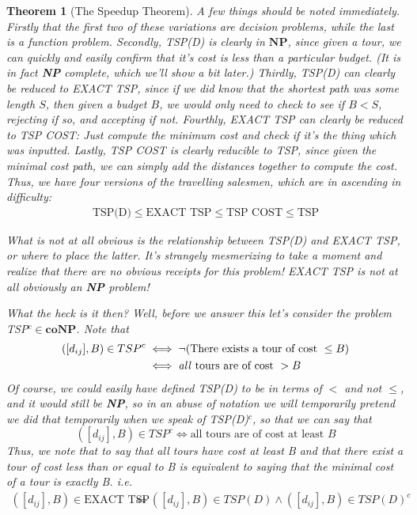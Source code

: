 \documentclass{article}
\theoremstyle{definition}
\theoremstyle{plain}
\theoremstyle{theorem}
\newtheorem{theorem}{Theorem}[section]
\begin{document}
\begin{theorem}[The Speedup Theorem]
A few things should be noted immediately. Firstly that the first two of these variations are decision problems, while the last is a function problem. Secondly, TSP(D) is clearly in $\textbf{NP}$, since given a tour, we can quickly and easily confirm that it's cost is less than a particular budget. (It is in fact \textbf{NP} complete, which we'll show a bit later.) Thirdly, TSP(D) can clearly be reduced to EXACT TSP, since if we \textit{did} know that the shortest path was some length $S$, then given a budget $B$, we would only need to check to see if $B < S$, rejecting if so, and accepting if not. Fourthly, EXACT TSP can clearly be reduced to TSP COST: Just compute the minimum cost and check if it's the thing which was inputted. Lastly, TSP COST is clearly reducible to TSP, since given the minimal cost path, we can simply add the distances together to compute the cost.
Thus, we have four versions of the travelling salesmen, which are in ascending in difficulty:
\begin{align}
    \textrm{TSP(D)} \leq \textrm{EXACT TSP} \leq \textrm{TSP COST} \leq \textrm{TSP}
\end{align}
\par What is \textit{not} at all obvious is the relationship between TSP(D) and EXACT TSP, or where to place the latter. It's strangely mesmerizing to take a moment and realize that there are no obvious receipts for this problem! EXACT TSP is not at all obviously an \textbf{NP} problem!
\par What the heck is it then? Well, before we answer this let's consider the problem TSP$^c \in \textbf{coNP}$. Note that
\begin{align}
    ([d_{ij}],B) \in TSP^c &\iff \neg(\textrm{There exists a tour of cost } \leq B) \\
            &\iff \textrm{\textit{all} tours are of cost } > B
\end{align}
Of course, we could easily have defined TSP(D) to be in terms of $<$ and not $\leq$, and it would still be \textbf{NP}, so in an abuse of notation we will temporarily pretend we did that temporarily when we speak of TSP(D)$^c$, so that we can say that 
\[ ([d_{ij}],B) \in TSP^c \iff \textrm{all tours are of cost at least $B$} \]
Thus, we note that to say that all tours have cost at least B \textit{and} that there exist a tour of cost less than or equal to B is \textit{equivalent} to saying that the minimal cost of a tour is \textit{exactly} B. i.e. 
\begin{align}
    ([d_{ij}],B) \in \textrm{EXACT TSP} &\iff ([d_{ij}],B) \in TSP(D) \wedge ([d_{ij}],B) \in TSP(D)^c

\end{align}
\end{theorem}
\end{document}
